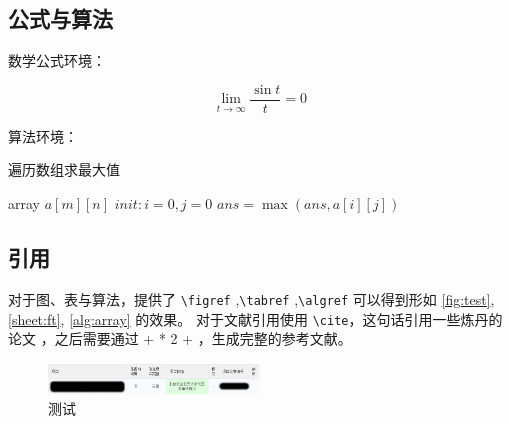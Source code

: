 \documentclass[lang=cn,12pt]{frbpaper}
\begin{document}
\subsection{公式与算法} 

数学公式环境：

\[\lim_{t \rightarrow \infty} \dfrac{\sin t}{t} = 0 \]

算法环境：

\begin{algorithm}
    \caption{遍历数组求最大值}
    \label{alg:array}
    \begin{algorithmic}
        \REQUIRE array \(a[m][n]\)
        \STATE \(init: i = 0, j = 0\)
        \REPEAT 
        \REPEAT
        \STATE \(ans = \max (ans, a[i][j])\)
    \end{algorithmic}
\end{algorithm}

\subsection{引用}

对于图、表与算法，提供了 \lstinline{\figref} ,\lstinline{\tabref} ,\lstinline{\algref} 可以得到形如 \ref{fig:test}, \ref{sheet:ft}, \ref{alg:array} 的效果。
对于文献引用使用 \lstinline{\cite}，这句话引用一些炼丹的论文 \cite{ghostnet,parashar2017scnn,park2017scale,abok}，之后需要通过  +  * 2 + ，生成完整的参考文献。


\begin{figure}[htb]
    \centering
    \includegraphics[width=0.5\textwidth]{figures/pass.png}
    \caption{测试}\label{fig:test}
    \label{fig:01}
\end{figure}
\end{document}
